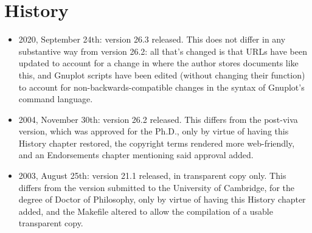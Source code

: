 \chapter*{History}

\begin{itemize}
\item{}2020, September 24th: version 26.3 released.  This does not
  differ in any substantive way from version 26.2: all that's changed
  is that URLs have been updated to account for a change in where the
  author stores documents like this, and Gnuplot scripts have been
  edited (without changing their function) to account for
  non-backwards-compatible changes in the syntax of Gnuplot's command
  language.
\item{}2004, November 30th: version 26.2 released.  This differs from the
  post-viva version, which was approved for the Ph.D., only by virtue
  of having this History chapter restored, the copyright terms rendered
  more web-friendly, and an Endorsements chapter mentioning said
  approval added.
\item{}2003, August 25th: version 21.1 released, in transparent copy
  only.  This differs from the version submitted to the University of
  Cambridge, for the degree of Doctor of Philosophy, only by virtue of
  having this History chapter added, and the Makefile altered to allow
  the compilation of a usable transparent copy.
\end{itemize}
